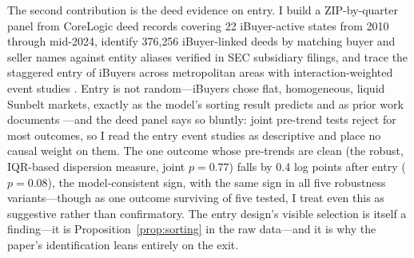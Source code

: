 \documentclass[12pt, letterpaper]{article}
\theoremstyle{remark}
\begin{document}
The second contribution is the deed evidence on entry. I build a ZIP-by-quarter panel from CoreLogic deed records covering 22 iBuyer-active states from 2010 through mid-2024, identify 376{,}256 iBuyer-linked deeds by matching buyer and seller names against entity aliases verified in SEC subsidiary filings, and trace the staggered entry of iBuyers across metropolitan areas with interaction-weighted event studies \citep{sun2021estimating}. Entry is not random---iBuyers chose flat, homogeneous, liquid Sunbelt markets, exactly as the model's sorting result predicts and as prior work documents \citep{seiler2023burgeoning, harrison2024impact}---and the deed panel says so bluntly: joint pre-trend tests reject for most outcomes, so I read the entry event studies as descriptive and place no causal weight on them. The one outcome whose pre-trends are clean (the robust, IQR-based dispersion measure, joint $p = 0.77$) falls by 0.4 log points after entry ($p = 0.08$), the model-consistent sign, with the same sign in all five robustness variants---though as one outcome surviving of five tested, I treat even this as suggestive rather than confirmatory. The entry design's visible selection is itself a finding---it is Proposition~\ref{prop:sorting} in the raw data---and it is why the paper's identification leans entirely on the exit.
\end{document}
